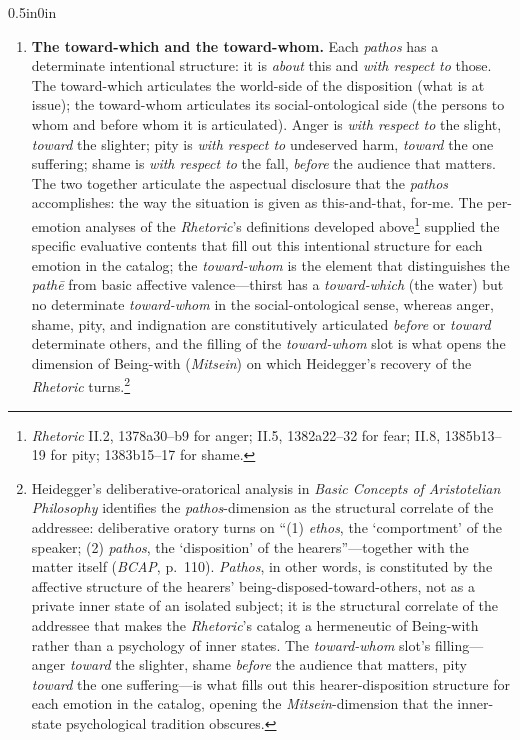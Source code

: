\begin{adjustwidth}{0.5in}{0in}
\begin{enumerate}
        \item \textbf{The toward-which and the toward-whom.} Each \textit{pathos} has a determinate intentional structure: it is \textit{about} this and \textit{with respect to} those. The toward-which articulates the world-side of the disposition (what is at issue); the toward-whom articulates its social-ontological side (the persons to whom and before whom it is articulated). Anger is \textit{with respect to} the slight, \textit{toward} the slighter; pity is \textit{with respect to} undeserved harm, \textit{toward} the one suffering; shame is \textit{with respect to} the fall, \textit{before} the audience that matters. The two together articulate the aspectual disclosure that the \textit{pathos} accomplishes: the way the situation is given as this-and-that, for-me. The per-emotion analyses of the \textit{Rhetoric}'s definitions developed above\footnote{\textit{Rhetoric} II.2, 1378a30--b9 for anger; II.5, 1382a22--32 for fear; II.8, 1385b13--19 for pity; 1383b15--17 for shame.} supplied the specific evaluative contents that fill out this intentional structure for each emotion in the catalog; the \textit{toward-whom} is the element that distinguishes the \textit{pathē} from basic affective valence---thirst has a \textit{toward-which} (the water) but no determinate \textit{toward-whom} in the social-ontological sense, whereas anger, shame, pity, and indignation are constitutively articulated \textit{before} or \textit{toward} determinate others, and the filling of the \textit{toward-whom} slot is what opens the dimension of Being-with (\textit{Mitsein}) on which Heidegger's recovery of the \textit{Rhetoric} turns.\footnote{Heidegger's deliberative-oratorical analysis in \textit{Basic Concepts of Aristotelian Philosophy} identifies the \textit{pathos}-dimension as the structural correlate of the addressee: deliberative oratory turns on ``(1) \textit{ethos}, the `comportment' of the speaker; (2) \textit{pathos}, the `disposition' of the hearers''---together with the matter itself (\textit{BCAP}, p.~110). \textit{Pathos}, in other words, is constituted by the affective structure of the hearers' being-disposed-toward-others, not as a private inner state of an isolated subject; it is the structural correlate of the addressee that makes the \textit{Rhetoric}'s catalog a hermeneutic of Being-with rather than a psychology of inner states. The \textit{toward-whom} slot's filling---anger \textit{toward} the slighter, shame \textit{before} the audience that matters, pity \textit{toward} the one suffering---is what fills out this hearer-disposition structure for each emotion in the catalog, opening the \textit{Mitsein}-dimension that the inner-state psychological tradition obscures.}
              

\end{enumerate}
\end{adjustwidth}
